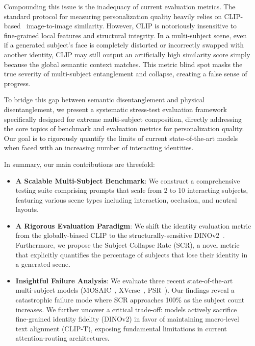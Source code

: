Compounding this issue is the inadequacy of current evaluation metrics. The standard protocol for measuring personalization quality heavily relies on CLIP-based~\cite{radford2021learning} image-to-image similarity. However, CLIP is notoriously insensitive to fine-grained local features and structural integrity. In a multi-subject scene, even if a generated subject's face is completely distorted or incorrectly swapped with another identity, CLIP may still output an artificially high similarity score simply because the global semantic context matches. This metric blind spot masks the true severity of multi-subject entanglement and collapse, creating a false sense of progress.

To bridge this gap between semantic disentanglement and physical disentanglement, we present a systematic stress-test evaluation framework specifically designed for extreme multi-subject composition, directly addressing the core topics of benchmark and evaluation metrics for personalization quality. Our goal is to rigorously quantify the limits of current state-of-the-art models when faced with an increasing number of interacting identities. 

In summary, our main contributions are threefold:
\begin{itemize}
    \item \textbf{A Scalable Multi-Subject Benchmark}: We construct a comprehensive testing suite comprising prompts that scale from 2 to 10 interacting subjects, featuring various scene types including interaction, occlusion, and neutral layouts.
    \item \textbf{A Rigorous Evaluation Paradigm}: We shift the identity evaluation metric from the globally-biased CLIP to the structurally-sensitive DINOv2~\cite{oquab2023dinov2}. Furthermore, we propose the Subject Collapse Rate (SCR), a novel metric that explicitly quantifies the percentage of subjects that lose their identity in a generated scene.
    \item \textbf{Insightful Failure Analysis}: We evaluate three recent state-of-the-art multi-subject models (MOSAIC~\cite{mosaic2024}, XVerse~\cite{xverse2024}, PSR~\cite{psr2024}). Our findings reveal a catastrophic failure mode where SCR approaches 100\% as the subject count increases. We further uncover a critical trade-off: models actively sacrifice fine-grained identity fidelity (DINOv2) in favor of maintaining macro-level text alignment (CLIP-T), exposing fundamental limitations in current attention-routing architectures.
\end{itemize}
